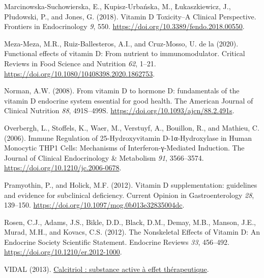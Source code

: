 \documentclass[
  letterpaper,
  DIV=11,
  numbers=noendperiod]{scrartcl}
\newlength{\cslhangindent}
\newlength{\cslentryspacingunit} %
\newenvironment{CSLReferences}[2] %
 {%
  \setlength{\parindent}{0pt}
  \ifodd #1
  \let\oldpar\par
  \def\par{\hangindent=\cslhangindent\oldpar}
  \fi
  \setlength{\parskip}{#2\cslentryspacingunit}
 }%
 {}
\begin{document}
\begin{CSLReferences}{0}{0}
\leavevmode{}%
Marcinowska-Suchowierska, E., Kupisz-Urbańska, M., Łukaszkiewicz, J.,
Płudowski, P., and Jones, G. (2018). {Vitamin D Toxicity--A Clinical
Perspective}. Frontiers in Endocrinology \emph{9}, 550.
\url{https://doi.org/10.3389/fendo.2018.00550}.

\leavevmode{}%
Meza-Meza, M.R., Ruiz-Ballesteros, A.I., and Cruz-Mosso, U. de la
(2020). {Functional effects of vitamin D: From nutrient to
immunomodulator}. Critical Reviews in Food Science and Nutrition
\emph{62}, 1--21. \url{https://doi.org/10.1080/10408398.2020.1862753}.

\leavevmode{}%
Norman, A.W. (2008). {From vitamin D to hormone D: fundamentals of the
vitamin D endocrine system essential for good health}. The American
Journal of Clinical Nutrition \emph{88}, 491S--499S.
\url{https://doi.org/10.1093/ajcn/88.2.491s}.

\leavevmode{}%
Overbergh, L., Stoffels, K., Waer, M., Verstuyf, A., Bouillon, R., and
Mathieu, C. (2006). {Immune Regulation of 25-Hydroxyvitamin
D-1α-Hydroxylase in Human Monocytic THP1 Cells: Mechanisms of
Interferon-γ-Mediated Induction}. The Journal of Clinical Endocrinology
\& Metabolism \emph{91}, 3566--3574.
\url{https://doi.org/10.1210/jc.2006-0678}.

\leavevmode{}%
Pramyothin, P., and Holick, M.F. (2012). {Vitamin D supplementation:
guidelines and evidence for subclinical deficiency}. Current Opinion in
Gastroenterology \emph{28}, 139--150.
\url{https://doi.org/10.1097/mog.0b013e32835004dc}.

\leavevmode{}%
Rosen, C.J., Adams, J.S., Bikle, D.D., Black, D.M., Demay, M.B., Manson,
J.E., Murad, M.H., and Kovacs, C.S. (2012). {The Nonskeletal Effects of
Vitamin D: An Endocrine Society Scientific Statement}. Endocrine Reviews
\emph{33}, 456--492. \url{https://doi.org/10.1210/er.2012-1000}.

\leavevmode{}%
VIDAL (2013).
\href{https://www.vidal.fr/medicaments/substances/calcitriol-4158.html}{{Calcitriol
: substance active à effet thérapeutique}}.

\end{CSLReferences}
\end{document}

